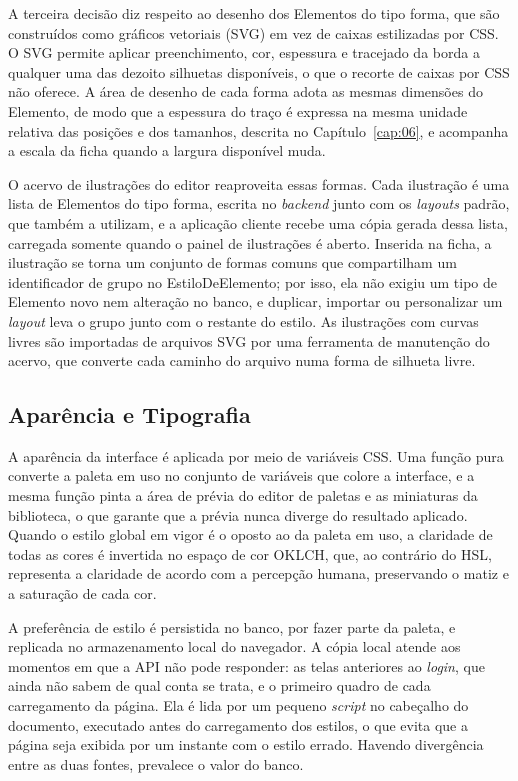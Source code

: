 A terceira decisão diz respeito ao desenho dos Elementos do tipo forma, que são construídos como gráficos vetoriais (SVG) em vez de caixas estilizadas por CSS. O SVG permite aplicar preenchimento, cor, espessura e tracejado da borda a qualquer uma das dezoito silhuetas disponíveis, o que o recorte de caixas por CSS não oferece. A área de desenho de cada forma adota as mesmas dimensões do Elemento, de modo que a espessura do traço é expressa na mesma unidade relativa das posições e dos tamanhos, descrita no Capítulo~\ref{cap:06}, e acompanha a escala da ficha quando a largura disponível muda.

O acervo de ilustrações do editor reaproveita essas formas. Cada ilustração é uma lista de Elementos do tipo forma, escrita no \textit{backend} junto com os \textit{layouts} padrão, que também a utilizam, e a aplicação cliente recebe uma cópia gerada dessa lista, carregada somente quando o painel de ilustrações é aberto. Inserida na ficha, a ilustração se torna um conjunto de formas comuns que compartilham um identificador de grupo no EstiloDeElemento; por isso, ela não exigiu um tipo de Elemento novo nem alteração no banco, e duplicar, importar ou personalizar um \textit{layout} leva o grupo junto com o restante do estilo. As ilustrações com curvas livres são importadas de arquivos SVG por uma ferramenta de manutenção do acervo, que converte cada caminho do arquivo numa forma de silhueta livre.

\subsection{Aparência e Tipografia}

A aparência da interface é aplicada por meio de variáveis CSS. Uma função pura converte a paleta em uso no conjunto de variáveis que colore a interface, e a mesma função pinta a área de prévia do editor de paletas e as miniaturas da biblioteca, o que garante que a prévia nunca diverge do resultado aplicado. Quando o estilo global em vigor é o oposto ao da paleta em uso, a claridade de todas as cores é invertida no espaço de cor OKLCH, que, ao contrário do HSL, representa a claridade de acordo com a percepção humana, preservando o matiz e a saturação de cada cor.

A preferência de estilo é persistida no banco, por fazer parte da paleta, e replicada no armazenamento local do navegador. A cópia local atende aos momentos em que a API não pode responder: as telas anteriores ao \textit{login}, que ainda não sabem de qual conta se trata, e o primeiro quadro de cada carregamento da página. Ela é lida por um pequeno \textit{script} no cabeçalho do documento, executado antes do carregamento dos estilos, o que evita que a página seja exibida por um instante com o estilo errado. Havendo divergência entre as duas fontes, prevalece o valor do banco.

